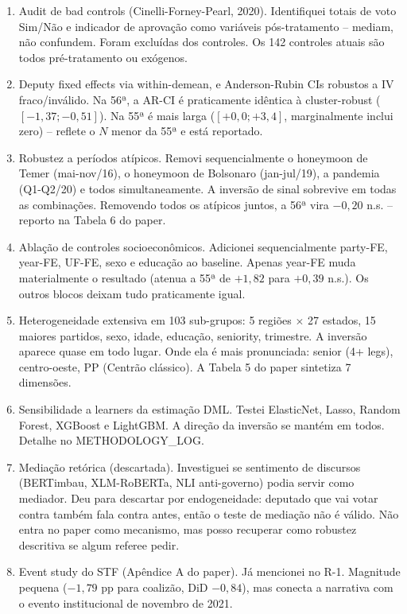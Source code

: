 \documentclass[11pt,a4paper]{article}
\begin{document}
\begin{enumerate}[leftmargin=*,itemsep=4pt]
\item Audit de bad controls (Cinelli-Forney-Pearl, 2020). Identifiquei totais de voto Sim/Não e indicador de aprovação como variáveis pós-tratamento -- mediam, não confundem. Foram excluídas dos controles. Os 142 controles atuais são todos pré-tratamento ou exógenos.

\item Deputy fixed effects via within-demean, e Anderson-Rubin CIs robustos a IV fraco/inválido. Na 56ª, a AR-CI é praticamente idêntica à cluster-robust ($[-1{,}37; -0{,}51]$). Na 55ª é mais larga ($[+0{,}0;+3{,}4]$, marginalmente inclui zero) -- reflete o $N$ menor da 55ª e está reportado.

\item Robustez a períodos atípicos. Removi sequencialmente o honeymoon de Temer (mai-nov/16), o honeymoon de Bolsonaro (jan-jul/19), a pandemia (Q1-Q2/20) e todos simultaneamente. A inversão de sinal sobrevive em todas as combinações. Removendo todos os atípicos juntos, a 56ª vira $-0{,}20$ n.s. -- reporto na Tabela 6 do paper.

\item Ablação de controles socioeconômicos. Adicionei sequencialmente party-FE, year-FE, UF-FE, sexo e educação ao baseline. Apenas year-FE muda materialmente o resultado (atenua a 55ª de $+1{,}82$ para $+0{,}39$ n.s.). Os outros blocos deixam tudo praticamente igual.

\item Heterogeneidade extensiva em 103 sub-grupos: 5 regiões $\times$ 27 estados, 15 maiores partidos, sexo, idade, educação, seniority, trimestre. A inversão aparece quase em todo lugar. Onde ela é mais pronunciada: senior (4+ legs), centro-oeste, PP (Centrão clássico). A Tabela 5 do paper sintetiza 7 dimensões.

\item Sensibilidade a learners da estimação DML. Testei ElasticNet, Lasso, Random Forest, XGBoost e LightGBM. A direção da inversão se mantém em todos. Detalhe no METHODOLOGY\_LOG.

\item Mediação retórica (descartada). Investiguei se sentimento de discursos (BERTimbau, XLM-RoBERTa, NLI anti-governo) podia servir como mediador. Deu para descartar por endogeneidade: deputado que vai votar contra também fala contra antes, então o teste de mediação não é válido. Não entra no paper como mecanismo, mas posso recuperar como robustez descritiva se algum referee pedir.

\item Event study do STF (Apêndice A do paper). Já mencionei no R-1. Magnitude pequena ($-1{,}79$ pp para coalizão, DiD $-0{,}84$), mas conecta a narrativa com o evento institucional de novembro de 2021.
\end{enumerate}
\end{document}

